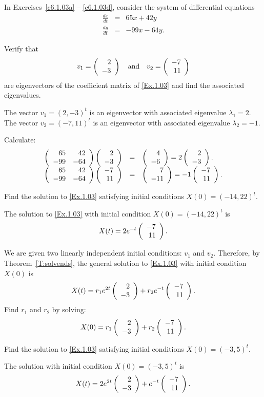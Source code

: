 \documentclass{ximera}
\begin{document}
\noindent In Exercises~\ref{c6.1.03a} -- \ref{c6.1.03d}, consider the system of
differential equations
\begin{equation} \label{Ex.1.03}
\begin{array}{rcr}
\frac{dx}{dt}  & = & 65x+42y \\
\frac{dy}{dt}  & = & -99x-64y.
\end{array}
\end{equation}
\begin{exercise} \label{c6.1.03a}
Verify that
\[
v_1 = \left(\begin{array}{r} 2 \\ -3\end{array}\right) \quad\mbox{and}\quad v_2 = \left(\begin{array}{r} -7 \\ 11\end{array}\right)
\]
are eigenvectors of the coefficient matrix of \eqref{Ex.1.03} and find
the associated eigenvalues.

\begin{solution}

\ans The vector $v_1 = (2,-3)^t$ is an eigenvector with associated
eigenvalue $\lambda_1 = 2$.  The vector $v_2 = (-7,11)^t$ is an
eigenvector with associated eigenvalue $\lambda_2 = -1$.

\soln Calculate:
\[
\begin{array}{rcl}
\left(\begin{array}{rr} 65 & 42\\ -99 &-64\end{array}\right)\left(\begin{array}{r} 2 \\ -3\end{array}\right) & = & \left(\begin{array}{r} 4 \\ -6\end{array}\right) =
2\left(\begin{array}{r} 2 \\ -3\end{array}\right). \\
\left(\begin{array}{rr} 65 & 42\\ -99 &-64\end{array}\right)\left(\begin{array}{r} -7 \\ 11\end{array}\right) & = & \left(\begin{array}{r} 7 \\ -11\end{array}\right) =
-1\left(\begin{array}{r} -7 \\ 11\end{array}\right).
\end{array}
\]

\end{solution}
\end{exercise}
\begin{exercise} \label{c6.1.03b}
Find the solution to \eqref{Ex.1.03} satisfying initial conditions $X(0) =
(-14,22)^t$.

\begin{solution}
\ans The solution to \eqref{Ex.1.03} with initial
condition $X(0) = (-14,22)^t$ is
\[
X(t) = 2e^{-t}\left(\begin{array}{r} -7 \\ 11\end{array}\right).
\]

\soln We are given two linearly independent initial conditions: $v_1$
and $v_2$.  Therefore, by Theorem~\ref{T:solvends}, 
the general solution to \eqref{Ex.1.03} with initial condition $X(0)$ is
\[
X(t) = r_1e^{2t}\left(\begin{array}{r} 2 \\ -3\end{array}\right) + r_2e^{-t}\left(\begin{array}{r} -7 \\ 11\end{array}\right).
\]
Find $r_1$ and $r_2$ by solving:
\begin{equation}  \label{c6.1.03eq}
X(0) = r_1\left(\begin{array}{r} 2 \\ -3\end{array}\right) + r_2\left(\begin{array}{r} -7 \\ 11\end{array}\right).
\end{equation}

\end{solution}
\end{exercise}
\begin{exercise} \label{c6.1.03c}
Find the solution to \eqref{Ex.1.03} satisfying initial conditions $X(0) =
(-3,5)^t$.

\begin{solution}
The solution with initial condition $X(0) = (-3,5)^t$ is
\[
X(t) = 2e^{2t}\left(\begin{array}{r} 2 \\ -3\end{array}\right) + e^{-t}\left(\begin{array}{r} -7 \\ 11\end{array}\right).
\]

\end{solution}
\end{exercise}
\end{document}
